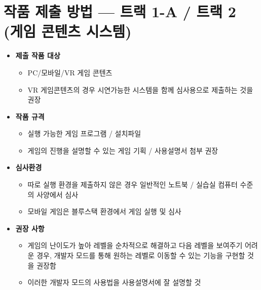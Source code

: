 \documentclass[11pt, a4paper]{article}
\begin{document}
\section{작품 제출 방법 — 트랙 1-A / 트랙 2 (게임 콘텐츠 시스템)}

\begin{infocard}
\begin{itemize}[leftmargin=1.5em, itemsep=6pt, label={\color{accent}\textbullet}]
  \item \textbf{제출 작품 대상}
    \begin{itemize}[leftmargin=1.5em, itemsep=2pt, label={\color{textmuted}$\triangleright$}]
      \item PC/모바일/VR 게임 콘텐츠
      \item VR 게임콘텐츠의 경우 시연가능한 시스템을 함께 심사용으로 제출하는 것을 권장
    \end{itemize}
  \item \textbf{작품 규격}
    \begin{itemize}[leftmargin=1.5em, itemsep=2pt, label={\color{textmuted}$\triangleright$}]
      \item 실행 가능한 게임 프로그램 / 설치파일
      \item 게임의 진행을 설명할 수 있는 게임 기획 / 사용설명서 첨부 권장
    \end{itemize}
  \item \textbf{심사환경}
    \begin{itemize}[leftmargin=1.5em, itemsep=2pt, label={\color{textmuted}$\triangleright$}]
      \item 따로 실행 환경을 제출하지 않은 경우 일반적인 노트북 / 실습실 컴퓨터 수준의 사양에서 심사
      \item 모바일 게임은 블루스택 환경에서 게임 실행 및 심사
    \end{itemize}
  \item \textbf{권장 사항}
    \begin{itemize}[leftmargin=1.5em, itemsep=2pt, label={\color{textmuted}$\triangleright$}]
      \item 게임의 난이도가 높아 레벨을 순차적으로 해결하고 다음 레벨을 보여주기 어려운 경우,
            개발자 모드를 통해 원하는 레벨로 이동할 수 있는 기능을 구현할 것을 권장함
      \item 이러한 개발자 모드의 사용법을 사용설명서에 잘 설명할 것
    \end{itemize}
\end{itemize}
\end{infocard}
\end{document}

